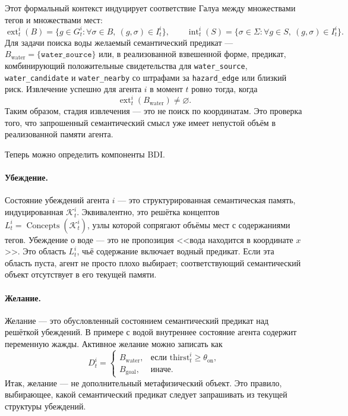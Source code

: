 \documentclass{article}
\begin{document}
Этот формальный контекст индуцирует соответствие Галуа между
множествами тегов и множествами мест:
\[
\operatorname{ext}_t^i(B)=\{g\in G_t^i:\forall\sigma\in B,\ (g,\sigma)\in I_t^i\},
\qquad
\operatorname{int}_t^i(S)=\{\sigma\in\Sigma:\forall g\in S,\ (g,\sigma)\in I_t^i\}.
\]
Для задачи поиска воды желаемый семантический предикат ---
$B_{\mathrm{water}}=\{\texttt{water\_source}\}$ или, в реализованной
взвешенной форме, предикат, комбинирующий положительные свидетельства
для \texttt{water\_source}, \texttt{water\_candidate} и
\texttt{water\_nearby} со штрафами за \texttt{hazard\_edge} или
близкий риск. Извлечение успешно для агента $i$ в момент $t$ ровно
тогда, когда
\[
\operatorname{ext}_t^i(B_{\mathrm{water}})\neq\varnothing .
\]
Таким образом, стадия извлечения --- это не поиск по координатам. Это
проверка того, что запрошенный семантический смысл уже имеет непустой
объём в реализованной памяти агента.

Теперь можно определить компоненты BDI.

\paragraph{Убеждение.} Состояние убеждений агента $i$ --- это
структурированная семантическая память, индуцированная
$\mathcal{K}_t^i$. Эквивалентно, это решётка концептов
$L_t^i=\operatorname{Concepts}(\mathcal{K}_t^i)$, узлы которой
сопрягают объёмы мест с содержаниями тегов. Убеждение о воде --- это
не пропозиция <<вода находится в координате $x$>>. Это область
$L_t^i$, чьё содержание включает водный предикат. Если эта область
пуста, агент не просто плохо выбирает; соответствующий семантический
объект отсутствует в его текущей памяти.

\paragraph{Желание.} Желание --- это обусловленный состоянием
семантический предикат над решёткой убеждений. В примере с водой
внутреннее состояние агента содержит переменную жажды. Активное
желание можно записать как
\[
D_t^i =
\begin{cases}
B_{\mathrm{water}}, & \text{если } \mathrm{thirst}_t^i\geq\theta_{\mathrm{on}},\\
B_{\mathrm{goal}}, & \text{иначе.}
\end{cases}
\]
Итак, желание --- не дополнительный метафизический объект. Это
правило, выбирающее, какой семантический предикат следует запрашивать
из текущей структуры убеждений.
\end{document}
